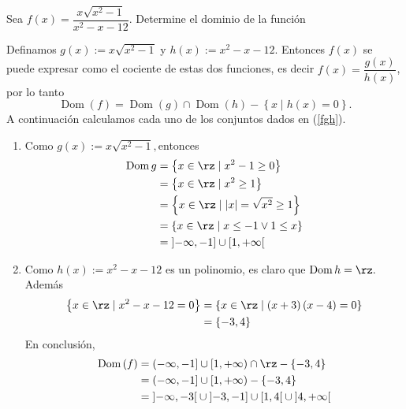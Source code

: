 \begin{example}
Sea $f(x)=\dfrac{x\sqrt{x^{2}-1}}{x^{2}-x-12}.$ Determine el dominio de la funci\'{o}n
\end{example}

\begin{sol}
Definamos $g\left(  x\right)  :=x\sqrt{x^{2}-1}$ y $h\left(  x\right)
:=x^{2}-x-12.$ Entonces $f\left(  x\right)  $ se puede expresar como el
cociente de estas dos funciones, es decir $f\left(  x\right)  =\dfrac{g\left(
x\right)  }{h\left(  x\right)  }$, por lo tanto%
\begin{equation}
\operatorname*{Dom}\left(  f\right)  =\operatorname*{Dom}\left(  g\right)
\cap\operatorname*{Dom}\left(  h\right)  -\left\{  x\mid h\left(  x\right)
=0\right\}  . \label{fgh}%
\end{equation}
A continuaci\'{o}n calculamos cada uno de los conjuntos dados en (\ref{fgh}).

\begin{enumerate}
\item Como $g\left(  x\right)  :=x\sqrt{x^{2}-1},$entonces
\begin{align*}
\operatorname*{Dom}g  &  =\left\{  x\in\rz\mid x^{2}-1\geq0\right\} \\
&  =\left\{  x\in\rz\mid x^{2}\geq1\right\} \\
&  =\left\{  x\in\rz\mid\left\vert x\right\vert =\sqrt{x^{2}}\geq1\right\} \\
&  =\left\{  x\in\rz\mid x\leq-1\vee1\leq x\right\} \\
&  =\left]  -\infty,-1\right]  \cup\left[  1,+\infty\right[
\end{align*}


\item Como $h\left(  x\right)  :=x^{2}-x-12$ es un polinomio, es claro que
$\operatorname*{Dom}h=\rz.$ Adem\'{a}s
\begin{align*}
\left\{  x\in\rz\mid x^{2}-x-12=0\right\}   &  =\left\{  x\in\rz\mid\left(
x+3\right)  \left(  x-4\right)  =0\right\} \\
&  =\left\{  -3,4\right\}
\end{align*}
En conclusi\'{o}n,
\begin{align*}
\operatorname*{Dom}\left(  f\right)   &  =\left(  -\infty,-1\right]
\cup\left[  1,+\infty\right)  \cap\rz-\left\{  -3,4\right\} \\
&  =\left(  -\infty,-1\right]  \cup\left[  1,+\infty\right)  -\left\{
-3,4\right\} \\
&  =\left]  -\infty,-3\right[  \cup\left]  -3,-1\right]  \cup\left[
1,4\right[  \cup\left]  4,+\infty\right[
\end{align*}

\end{enumerate}
\end{sol}

